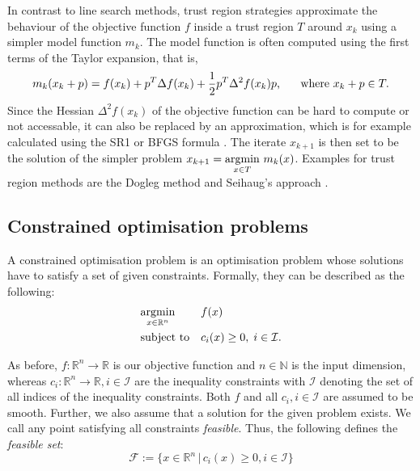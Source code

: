 \indent In contrast to line search methods, trust region strategies approximate the behaviour of the objective function $f$ inside a trust region $T$ around $x_k$ using a simpler model function $m_k$. The model function is often computed using the first terms of the Taylor expansion, that is, \[m_k(x_k + p) = f(x_k) + p^T\Delta f(x_k) + \frac{1}{2}p^T\Delta^2 f(x_k) p \text{, \indent where } x_k + p \in T.\] Since the Hessian $\Delta^2 f(x_k)$ of the objective function can be hard to compute or not accessable, it can also be replaced by an approximation, which is for example calculated using the SR1 or BFGS formula \cite{NoceWrig06}. The iterate $x_{k+1}$ is then set to be the solution of the simpler problem $x_{k+1} = \underset{x \in T}{\operatorname*{argmin} }  \,\,m_k(x)$. Examples for trust region methods are the Dogleg method and Seihaug's approach \cite{NoceWrig06}.

\subsection{Constrained optimisation problems}
\label{ssec:copt_prob}
A constrained optimisation problem is an optimisation problem whose solutions have to satisfy a set of given constraints. Formally, they can be described as the following:\\
\begin{equation}
	\label{constrained_min_problem}
	\begin{aligned}
		& \underset{x \in \mathbb{R}^n}{\operatorname*{argmin}}
		& & f(x) \\
		& \text{subject to}
		& & c_i(x) \geq 0, \; i \in \mathcal{I}.
	\end{aligned}
\end{equation}

As before, $f\colon \mathbb{R}^n\to \mathbb{R}$ is our objective function and $n \in \mathbb{N}$ is the input dimension, whereas $c_i\colon \mathbb{R}^n\to \mathbb{R}, i \in \mathcal{I}$ are the inequality constraints with $\mathcal{I}$ denoting the set of all indices of the inequality constraints. Both $f$ and all $c_i, i \in \mathcal{I}$ are assumed to be smooth. Further, we also assume that a solution for the given problem exists. We call any point satisfying all constraints \textit{feasible}. Thus, the following defines the \textit{feasible set}:
\[ \mathcal{F} := \{x \in \mathbb{R}^n \,|\, c_i(x) \geq 0, i\in \mathcal{I} \} \]

